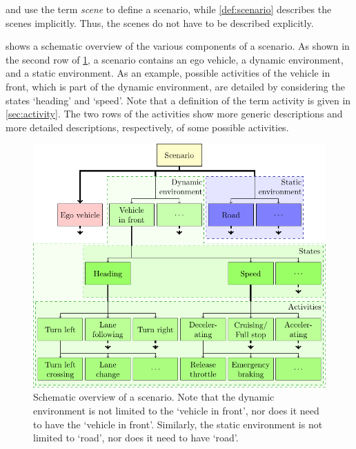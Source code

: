 
\textcite{geyer2014} and \textcite{ulbrich2015} use the term \emph{scene} to define a scenario, while \cref{def:scenario} describes the scenes implicitly. Thus, the scenes do not have to be described explicitly.

 shows a schematic overview of the various components of a scenario. As shown in the second row of \cref{fig:scenario}, a scenario contains an ego vehicle, a dynamic environment, and a static environment. As an example, possible activities of the vehicle in front, which is part of the dynamic environment, are detailed by considering the states `heading' and `speed'. Note that a definition of the term activity is given in \cref{sec:activity}. The two rows of the activities show more generic descriptions and more detailed descriptions, respectively, of some possible activities.

\begin{figure}
	\centering
	\includegraphics[width=\linewidth]{figures/scenario.pdf}%
	\caption{Schematic overview of a scenario. Note that the dynamic environment is not limited to the `vehicle in front', nor does it need to have the `vehicle in front'. Similarly, the static environment is not limited to `road', nor does it need to have `road'.}
	\label{fig:scenario}
\end{figure}

